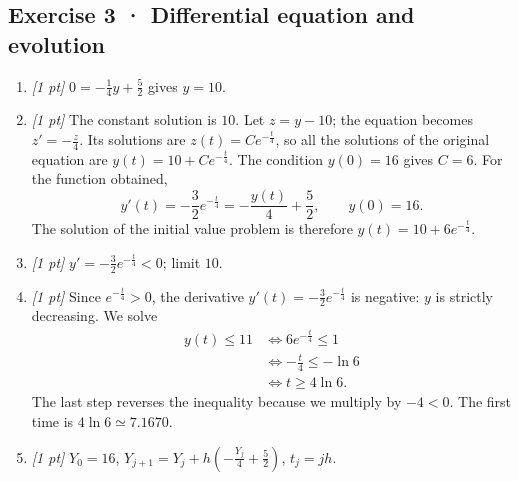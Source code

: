 \subsection*{Exercise 3 · Differential equation and evolution}\begin{enumerate}

\item \textit{[1 pt]} $0=-\frac{1}{4}y+\frac{5}{2}$ gives $y=10$.

\item \textit{[1 pt]} The constant solution is $10$. Let $z=y-10$; the equation becomes $z'=-\frac{z}{4}$. Its solutions are $z(t)=Ce^{-\frac{t}{4}}$, so all the solutions of the original equation are $y(t)=10+Ce^{-\frac{t}{4}}$.
The condition $y(0)=16$ gives $C=6$. For the function obtained,
\[y'(t)=-\frac{3}{2}e^{-\frac{t}{4}}=-\frac{y(t)}{4}+\frac{5}{2},\qquad y(0)=16.\]
The solution of the initial value problem is therefore $y(t)=10+6e^{-\frac{t}{4}}$.

\item \textit{[1 pt]} $y'=-\frac{3}{2}e^{-\frac{t}{4}}<0$; limit $10$.

\item \textit{[1 pt]} Since $e^{-\frac{t}{4}}>0$, the derivative $y'(t)=-\frac{3}{2}e^{-\frac{t}{4}}$ is negative: $y$ is strictly decreasing. We solve
\[\begin{aligned}y(t)\le 11&\Longleftrightarrow 6e^{-\frac{t}{4}}\le1\\&\Longleftrightarrow -\frac{t}{4}\le-\ln 6\\&\Longleftrightarrow t\ge 4\ln 6.\end{aligned}\]
The last step reverses the inequality because we multiply by $-4<0$. The first time is $4\ln 6\simeq7.1670$.

\item \textit{[1 pt]} $Y_0=16$, $Y_{j+1}=Y_j+h(-\frac{Y_j}{4}+\frac{5}{2})$, $t_j=jh$.

\end{enumerate}

